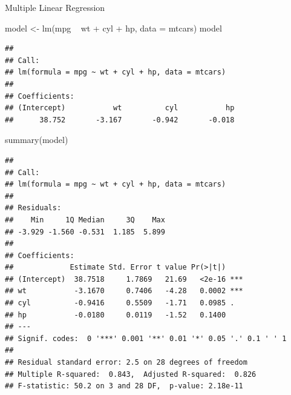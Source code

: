 \documentclass[9pt,ignorenonframetext,]{beamer}
\newenvironment{Shaded}{\begin{snugshade}}{\end{snugshade}}
\newcommand{\DataTypeTok}[1]{\textcolor[rgb]{0.87,0.87,0.75}{#1}}
\newcommand{\KeywordTok}[1]{\textcolor[rgb]{0.94,0.87,0.69}{#1}}
\newcommand{\NormalTok}[1]{\textcolor[rgb]{0.80,0.80,0.80}{#1}}
\newcommand{\OperatorTok}[1]{\textcolor[rgb]{0.94,0.94,0.82}{#1}}
\newcommand{\StringTok}[1]{\textcolor[rgb]{0.80,0.58,0.58}{#1}}
\begin{document}
\begin{frame}[fragile]{Multiple Linear Regression}
\protect\hypertarget{multiple-linear-regression}{}

\footnotesize

\begin{Shaded}
\begin{Highlighting}[]
\NormalTok{model <-}\StringTok{ }\KeywordTok{lm}\NormalTok{(mpg }\OperatorTok{~}\StringTok{ }\NormalTok{wt }\OperatorTok{+}\StringTok{ }\NormalTok{cyl }\OperatorTok{+}\StringTok{ }\NormalTok{hp, }\DataTypeTok{data =}\NormalTok{ mtcars)}
\NormalTok{model}
\end{Highlighting}
\end{Shaded}

\begin{verbatim}
## 
## Call:
## lm(formula = mpg ~ wt + cyl + hp, data = mtcars)
## 
## Coefficients:
## (Intercept)           wt          cyl           hp  
##      38.752       -3.167       -0.942       -0.018
\end{verbatim}

\begin{Shaded}
\begin{Highlighting}[]
\KeywordTok{summary}\NormalTok{(model)}
\end{Highlighting}
\end{Shaded}

\begin{verbatim}
## 
## Call:
## lm(formula = mpg ~ wt + cyl + hp, data = mtcars)
## 
## Residuals:
##    Min     1Q Median     3Q    Max 
## -3.929 -1.560 -0.531  1.185  5.899 
## 
## Coefficients:
##             Estimate Std. Error t value Pr(>|t|)    
## (Intercept)  38.7518     1.7869   21.69   <2e-16 ***
## wt           -3.1670     0.7406   -4.28   0.0002 ***
## cyl          -0.9416     0.5509   -1.71   0.0985 .  
## hp           -0.0180     0.0119   -1.52   0.1400    
## ---
## Signif. codes:  0 '***' 0.001 '**' 0.01 '*' 0.05 '.' 0.1 ' ' 1
## 
## Residual standard error: 2.5 on 28 degrees of freedom
## Multiple R-squared:  0.843,  Adjusted R-squared:  0.826 
## F-statistic: 50.2 on 3 and 28 DF,  p-value: 2.18e-11
\end{verbatim}

\end{frame}
\end{document}
